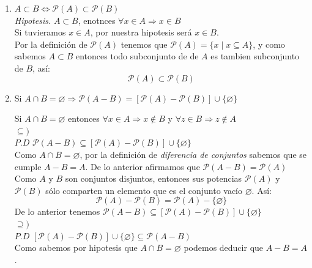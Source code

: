 \documentclass[12pt]{article}
\begin{document}
\begin{enumerate}[label=\alph*)]
    \item $A \subset B \Longleftrightarrow \mathcal{P}(A) \subset \mathcal{P}(B)$\\

    \textit{Hipotesis.} $A \subset B$, enotnces $\forall x \in A \Longrightarrow x \in B$\\

    Si tuvieramos $x \in A$, por nuestra hipotesis será $x \in B$.\\

    Por la definición de $\mathcal{P}(A)$ tenemos que $\mathcal{P}(A) = \{x \mid x \subseteq A\}$, y como sabemos $A \subset B$ entonces
    todo subconjunto de de $A$ es tambien subconjunto de $B$, así:
    \[\mathcal{P}(A) \subset \mathcal{P}(B)\]

    \item Si $A \cap B = \varnothing \Longrightarrow \mathcal{P}(A - B) = [\mathcal{P}(A) - \mathcal{P}(B)] \cup \{\varnothing\}$

    Si $A \cap B = \varnothing$ entonces $\forall x \in A \Longrightarrow x \notin B$ y $\forall z \in B \Longrightarrow z \notin A$\\

    $\subseteq)$\\
    $P.D$ $\mathcal{P}(A - B) \subseteq [\mathcal{P}(A) - \mathcal{P}(B)] \cup \{\varnothing\}$\\
    
    Como $A \cap B = \varnothing$, por la definición de \textit{diferencia de conjuntos} sabemos que se cumple $A - B = A$. De lo anterior 
    afirmamos que $ \mathcal{P}(A - B) = \mathcal{P}(A)$\\

    Como $A$ y $B$ son conjuntos disjuntos, entonces sus potencias $\mathcal{P}(A)$ y $\mathcal{P}(B)$ sólo comparten un 
    elemento que es el conjunto vacío $\varnothing$. Así:
    \[\mathcal{P}(A) - \mathcal{P}(B) = \mathcal{P}(A) - \{\varnothing\}\]
    De lo anterior tenemos $\mathcal{P}(A - B) \subseteq [\mathcal{P}(A) - \mathcal{P}(B)] \cup \{\varnothing\}$\\

    $\supseteq)$\\
    $P.D$ $[\mathcal{P}(A) - \mathcal{P}(B)] \cup \{\varnothing\} \subseteq \mathcal{P}(A - B)$\\

    Como sabemos por hipotesis que $A \cap B = \varnothing$ podemos deducir que $A - B = A$.\\


\end{enumerate}
\end{document}
